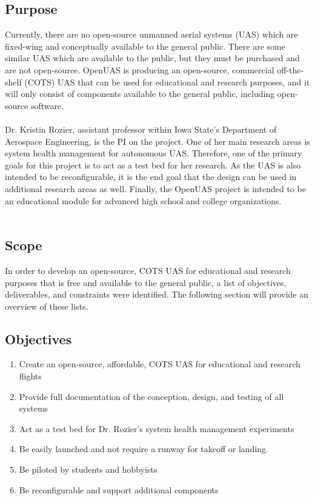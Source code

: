 \documentclass{article}
\begin{document}
\subsection{Purpose}
Currently, there are no open-source unmanned aerial systems (UAS) which are fixed-wing and conceptually available to the general public. There are some similar UAS which are available to the public, but they must be purchased and are not open-source. OpenUAS is producing an open-source, commercial off-the-shelf (COTS) UAS that can be used for educational and research purposes, and it will only consist of components available to the general public, including open-source software.\\\\
Dr. Kristin Rozier, assistant professor within Iowa State's Department of Aerospace Engineering, is the PI on the project. One of her main research areas is system health management for autonomous UAS. Therefore, one of the primary goals for this project is to act as a test bed for her research. As the UAS is also intended to be reconfigurable, it is the end goal that the design can be used in additional research areas as well. Finally, the OpenUAS project is intended to be an educational module for advanced high school and college organizations.\\\\

\subsection{Scope}
In order to develop an open-source, COTS UAS for educational and research purposes that is free and available to the general public, a list of objectives, deliverables, and constraints were identified. The following section will provide an overview of these lists.

\subsection{Objectives}
\begin{enumerate}
\item Create an open-source, affordable, COTS UAS for educational and research flights
\item Provide full documentation of the conception, design, and testing of all systems
\item Act as a test bed for Dr. Rozier's system health management experiments
\item Be easily launched and not require a runway for takeoff or landing. 
\item Be piloted by students and hobbyists
\item Be reconfigurable and support additional components
\end{enumerate}
\end{document}
